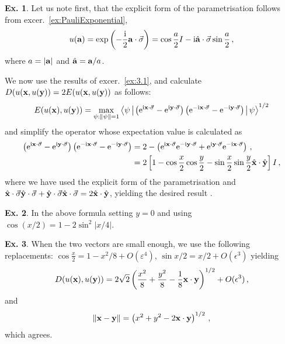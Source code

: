 \documentclass[a4paper,12pt]{article}
\def\e{\mathrm{e}}
\def\imagi{\mathrm{i}}
\def\Tr{\ensuremath{\mathop{\rm Tr}}{}}
\theoremstyle{definition}
\newtheorem{exercise}{Ex.}[section]
\begin{document}
\begin{exercise}
 Let us note first, that the explicit form of the parametrisation follows from excer.~\ref{ex:PauliExponential},
 \[
  u({\bf a})=\exp\left(-\frac{\imagi}{2} {\bf a}\cdot \vec{\sigma}\right) = \cos \frac{a}{2} I -\imagi \hat{\bf a}\cdot\vec{\sigma}\sin\frac{a}{2}\,,
 \]
 where $a=|{\bf a}|$ and $\hat{\bf a} = {\bf a}/a$.

 We now use the results of excer.~\ref{ex:3.1}, and calculate $D(u({\bf x}, u({\bf y})) = 2E(u({\bf x}, u({\bf y}))$ as follows:
 \[
  E(u({\bf x}), u({\bf y})) = \max_{\rm \psi:\|\psi\|=1}\left\langle \psi \left|\left. \left(\e^{\imagi {\bf x}\cdot\vec{\sigma}}-\e^{\imagi {\bf y}\cdot\vec{\sigma}}\right)\left(\e^{-\imagi {\bf x}\cdot\vec{\sigma}}-\e^{-\imagi {\bf y}\cdot\vec{\sigma}}\right)\right.\right|\psi\right\rangle^{1/2}
 \]
 and simplify the operator whose expectation value is calculated as
 \[
  \begin{aligned}
   \left(\e^{\imagi {\bf x}\cdot\vec{\sigma}}-\e^{\imagi {\bf y}\cdot\vec{\sigma}}\right)\left(\e^{-\imagi {\bf x}\cdot\vec{\sigma}}-\e^{-\imagi {\bf y}\cdot\vec{\sigma}}\right) &= 2-\left( \e^{\imagi {\bf x}\cdot\vec{\sigma}}\e^{-\imagi {\bf y}\cdot\vec{\sigma}} + \e^{\imagi {\bf y}\cdot\vec{\sigma}}\e^{-\imagi {\bf x}\cdot\vec{\sigma}}\right)\,,\\
   &= 2\left[1-\cos\frac{x}{2}\cos\frac{y}{2} - \sin\frac{x}{2}\sin\frac{y}{2}\hat{\bf x}\cdot \hat{\bf y}\right] I\,,
  \end{aligned}
 \]
 where we have used the explicit form of the parametrisation and $\hat{\bf x}\cdot \vec{\sigma} \hat{\bf y}\cdot \vec{\sigma} + \hat{\bf y}\cdot \vec{\sigma} \hat{\bf x}\cdot \vec{\sigma} = 2 \hat{\bf x}\cdot\hat{\bf y}$, yielding the desired result \cite{a33}.
\end{exercise}

\begin{exercise}
 In the above formula setting $y=0$ and using $\cos(x/2) = 1-2\sin^2|x/4|$.
\end{exercise}

\begin{exercise}
 When the two vectors are small enough, we use the following replacements: $\cos\frac{x}{2}=1-x^2/8 + O(\varepsilon^4)$, $\sin x/2 = x/2 + O(\epsilon^3)$ yielding
 \[
  D(u({\bf x}), u({\bf y})) = 2\sqrt{2}\left(\frac{x^2}{8} + \frac{y^2}{8}-\frac{1}{8}{\bf x}\cdot{\bf y}\right)^{1/2} + O(\epsilon^3)\,,
 \]
 and
 \[
  \|{\bf x}-{\bf y}\|=\left(x^2 + y^2 - 2{\bf x}\cdot{\bf y} \right)^{1/2}\,,
 \]
 which agrees.
\end{exercise}
\end{document}

